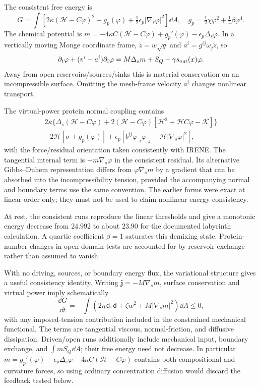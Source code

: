 The consistent free energy is
\begin{equation}
G=\int[2\kappa(\mathcal H-C\varphi)^2+g_p(\varphi)+\tfrac12\epsilon_p|\nabla_s\varphi|^2]\dd A,
\quad g_p=\tfrac12\chi\varphi^2+\tfrac14\beta\varphi^4 .
\end{equation}
The chemical potential is $m=-4\kappa C(\mathcal H-C\varphi)+g_p'(\varphi)-\epsilon_p\Delta_s\varphi$. In a vertically moving Monge coordinate frame, $\dot z=w\sqrt g$ and $a^i=g^{ij}\omega_j\dot z$, so
\begin{equation}
\partial_t\varphi+(v^i-a^i)\partial_i\varphi=M\Delta_s m+S_Q-\gamma s_{\rm out}(x)\varphi .
\end{equation}
Away from open reservoirs/sources/sinks this is material conservation on an incompressible surface. Omitting the mesh-frame velocity $a^i$ changes nonlinear transport.

The virtual-power protein normal coupling contains
\begin{multline}
2\kappa\{\Delta_s(\mathcal H-C\varphi)+2(\mathcal H-C\varphi)
[\mathcal H^2+\mathcal H C\varphi-\mathcal K]\}\\
-2\mathcal H[\sigma+g_p(\varphi)]
+\epsilon_p[b^{ij}\varphi_{,i}\varphi_{,j}-\mathcal H|\nabla_s\varphi|^2],
\end{multline}
with the force/residual orientation taken consistently with IRENE. The tangential internal term is $-m\nabla_s\varphi$ in the consistent residual. Its alternative Gibbs--Duhem representation differs from $\varphi\nabla_s m$ by a gradient that can be absorbed into the incompressibility tension, provided the accompanying normal and boundary terms use the same convention. The earlier forms were exact at linear order only; they must not be used to claim nonlinear energy consistency.

At rest, the consistent runs reproduce the linear thresholds and give a monotonic energy decrease from $24.992$ to about $23.90$ for the documented labyrinth calculation. A quartic coefficient $\beta=1$ saturates this demixing state. Protein-number changes in open-domain tests are accounted for by reservoir exchange rather than assumed to vanish.


With no driving, sources, or boundary energy flux, the variational structure gives a useful consistency identity. Writing $\bm j=-M\nabla_s m$, surface conservation and virtual power imply schematically
\begin{equation}
\frac{\dd G}{\dd t}=-\int\left(2\eta\,\mathsf d:\mathsf d
+\zeta w^2+M|\nabla_s m|^2\right)\dd A\le0,
\label{eq:protein-dissipation}
\end{equation}
with any imposed-tension contribution included in the constrained mechanical functional. The terms are tangential viscous, normal-friction, and diffusive dissipation. Driven/open runs additionally include mechanical input, boundary exchange, and $\int mS_Q\dd A$; their free energy need not decrease. In particular $m=g_p'(\varphi)-\epsilon_p\Delta_s\varphi-4\kappa C(\mathcal H-C\varphi)$ contains both compositional and curvature forces, so using ordinary concentration diffusion would discard the feedback tested below.

